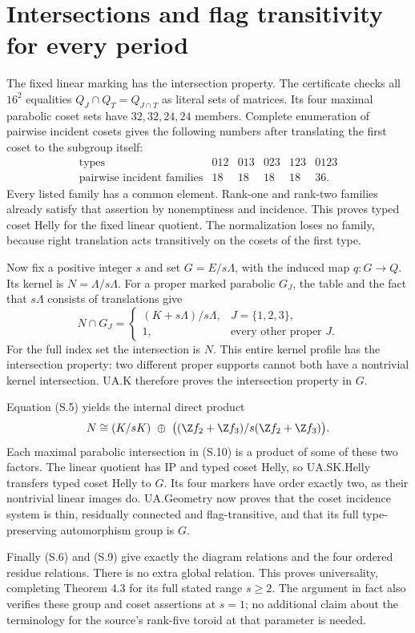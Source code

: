 \section{Intersections and flag transitivity for every period}
The fixed linear marking has the intersection property. The certificate
checks all $16^2$ equalities $Q_J\cap Q_T=Q_{J\cap T}$ as literal
sets of matrices. Its four maximal parabolic coset sets have
$32,32,24,24$ members. Complete enumeration of pairwise incident cosets
gives the following numbers after translating the first coset to the
subgroup itself:
\[
\begin{array}{c|rrrrr}
\text{types}&012&013&023&123&0123\\\hline
\text{pairwise incident families}&18&18&18&18&36.
\end{array}
\]
Every listed family has a common element. Rank-one and rank-two
families already satisfy that assertion by nonemptiness and incidence.
This proves typed coset Helly for the fixed linear quotient. The
normalization loses no family, because right translation acts
transitively on the cosets of the first type.

Now fix a positive integer $s$ and set $G=E/s\Lambda$, with the
induced map $q:G\to Q$. Its kernel is $N=\Lambda/s\Lambda$.
For a proper marked parabolic $G_J$, the table and the fact that
$s\Lambda$ consists of translations give
\[
 N\cap G_J=
 \begin{cases}
 (K+s\Lambda)/s\Lambda,&J=\{1,2,3\},\\
 1,&\text{every other proper }J.
 \end{cases}                                       \tag{S.10}
\]
For the full index set the intersection is $N$. This entire kernel
profile has the intersection property: two different proper supports
cannot both have a nontrivial kernel intersection. UA.K therefore
proves the intersection property in $G$.

Equation (S.5) yields the internal direct product
\[
 N\cong (K/sK)\ \oplus\
       \bigl((\Z f_2+\Z f_3)/s(\Z f_2+\Z f_3)\bigr).
\]
Each maximal parabolic intersection in (S.10) is a product of some
of these two factors. The linear quotient has IP and typed coset
Helly, so UA.SK.Helly transfers typed coset Helly to $G$.
Its four markers have order exactly two, as their nontrivial linear
images do. UA.Geometry now proves that the coset incidence system
is thin, residually connected and flag-transitive, and that its full
type-preserving automorphism group is $G$.

Finally (S.6) and (S.9) give exactly the diagram relations and the four
ordered residue relations. There is no extra global relation. This
proves universality, completing Theorem 4.3 for its full stated range
$s\geq2$. The argument in fact also verifies these group and coset
assertions at $s=1$; no additional claim about the terminology for the
source's rank-five toroid at that parameter is needed.
